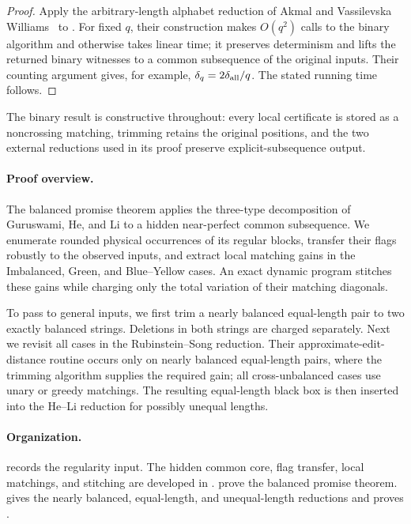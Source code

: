 \documentclass[11pt]{article}
\theoremstyle{remark}
\begin{document}
\begin{proof}
Apply the arbitrary-length alphabet reduction of Akmal and Vassilevska
Williams~\cite{AkmalVW} to .  For fixed $q$, their construction
makes $O(q^2)$ calls to the binary algorithm and otherwise takes linear time;
it preserves determinism and lifts the returned binary witnesses to a common
subsequence of the original inputs.  Their counting argument gives, for
example, $\delta_q=2\delta_{\rm all}/q$.  The stated running time follows.
\end{proof}

The binary result is constructive throughout: every local certificate is
stored as a noncrossing matching, trimming retains the original positions,
and the two external reductions used in its proof preserve
explicit-subsequence output.

\paragraph{Proof overview.}
The balanced promise theorem applies the three-type decomposition of
Guruswami, He, and Li to a hidden near-perfect common subsequence.  We
enumerate rounded physical occurrences of its regular blocks, transfer their
flags robustly to the observed inputs, and extract local matching gains in
the Imbalanced, Green, and Blue--Yellow cases.  An exact dynamic program
stitches these gains while charging only the total variation of their
matching diagonals.

To pass to general inputs, we first trim a nearly balanced equal-length pair
to two exactly balanced strings.  Deletions in both strings are charged
separately.  Next we revisit all cases in the Rubinstein--Song reduction.
Their approximate-edit-distance routine occurs only on nearly balanced
equal-length pairs, where the trimming algorithm supplies the required
gain; all cross-unbalanced cases use unary or greedy matchings.  The resulting
equal-length black box is then inserted into the He--Li reduction for
possibly unequal lengths.

\paragraph{Organization.}
 records the regularity input.  The hidden common core,
flag transfer, local matchings, and stitching are developed in
.
 prove the balanced
promise theorem.   gives the nearly balanced,
equal-length, and unequal-length reductions and proves .
\end{document}
